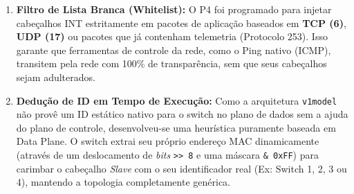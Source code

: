 \begin{enumerate}
    \item \textbf{Filtro de Lista Branca (Whitelist):} O P4 foi programado para injetar cabeçalhos INT estritamente em pacotes de aplicação baseados em \textbf{TCP (6)}, \textbf{UDP (17)} ou pacotes que já contenham telemetria (Protocolo 253). Isso garante que ferramentas de controle da rede, como o Ping nativo (ICMP), transitem pela rede com 100\% de transparência, sem que seus cabeçalhos sejam adulterados.
    \item \textbf{Dedução de ID em Tempo de Execução:} Como a arquitetura \texttt{v1model} não provê um ID estático nativo para o switch no plano de dados sem a ajuda do plano de controle, desenvolveu-se uma heurística puramente baseada em Data Plane. O switch extrai seu próprio endereço MAC dinamicamente (através de um deslocamento de \textit{bits} \texttt{>> 8} e uma máscara \texttt{\& 0xFF}) para carimbar o cabeçalho \textit{Slave} com o seu identificador real (Ex: Switch 1, 2, 3 ou 4), mantendo a topologia completamente genérica.
\end{enumerate}